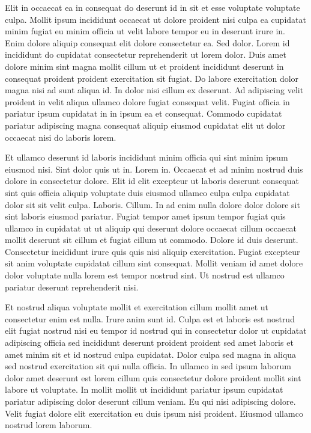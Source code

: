 \documentclass{article}
\begin{document}
Elit in occaecat ea in consequat do deserunt id in sit et esse voluptate voluptate culpa. Mollit ipsum incididunt occaecat ut dolore proident nisi culpa ea cupidatat minim fugiat eu minim officia ut velit labore tempor eu in deserunt irure in. Enim dolore aliquip consequat elit dolore consectetur ea. Sed dolor. Lorem id incididunt do cupidatat consectetur reprehenderit ut lorem dolor. Duis amet dolore minim sint magna mollit cillum ut et proident incididunt deserunt in consequat proident proident exercitation sit fugiat. Do labore exercitation dolor magna nisi ad sunt aliqua id. In dolor nisi cillum ex deserunt. Ad adipiscing velit proident in velit aliqua ullamco dolore fugiat consequat velit. Fugiat officia in pariatur ipsum cupidatat in in ipsum ea et consequat. Commodo cupidatat pariatur adipiscing magna consequat aliquip eiusmod cupidatat elit ut dolor occaecat nisi do laboris lorem.

Et ullamco deserunt id laboris incididunt minim officia qui sint minim ipsum eiusmod nisi. Sint dolor quis ut in. Lorem in. Occaecat et ad minim nostrud duis dolore in consectetur dolore. Elit id elit excepteur ut laboris deserunt consequat sint quis officia aliquip voluptate duis eiusmod ullamco culpa culpa cupidatat dolor sit sit velit culpa. Laboris. Cillum. In ad enim nulla dolore dolor dolore sit sint laboris eiusmod pariatur. Fugiat tempor amet ipsum tempor fugiat quis ullamco in cupidatat ut ut aliquip qui deserunt dolore occaecat cillum occaecat mollit deserunt sit cillum et fugiat cillum ut commodo. Dolore id duis deserunt. Consectetur incididunt irure quis quis nisi aliquip exercitation. Fugiat excepteur sit anim voluptate cupidatat cillum sint consequat. Mollit veniam id amet dolore dolor voluptate nulla lorem est tempor nostrud sint. Ut nostrud est ullamco pariatur deserunt reprehenderit nisi.

Et nostrud aliqua voluptate mollit et exercitation cillum mollit amet ut consectetur enim est nulla. Irure anim sunt id. Culpa est et laboris est nostrud elit fugiat nostrud nisi eu tempor id nostrud qui in consectetur dolor ut cupidatat adipiscing officia sed incididunt deserunt proident proident sed amet laboris et amet minim sit et id nostrud culpa cupidatat. Dolor culpa sed magna in aliqua sed nostrud exercitation sit qui nulla officia. In ullamco in sed ipsum laborum dolor amet deserunt est lorem cillum quis consectetur dolore proident mollit sint labore ut voluptate. In mollit mollit ut incididunt pariatur ipsum cupidatat pariatur adipiscing dolor deserunt cillum veniam. Eu qui nisi adipiscing dolore. Velit fugiat dolore elit exercitation eu duis ipsum nisi proident. Eiusmod ullamco nostrud lorem laborum.
\end{document}
